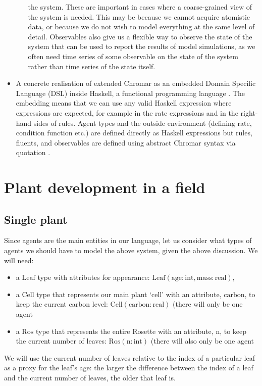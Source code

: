 \documentclass[phd]{infthesis}
\begin{document}
\begin{itemize}
\begin{itemize}
    the system. These are important in cases where a coarse-grained view of the
    system is needed. This may be because we cannot acquire atomistic data, or
    because we do not wish to model everything at the same level of
    detail. Observables also give us a flexible way to observe the state of the
    system that can be used to report the results of model simulations, as we
    often need time series of some observable on the state of the system rather
    than time series of the state itself.
\end{itemize}
\item A concrete realisation of extended Chromar as an embedded Domain Specific
  Language (DSL) inside Haskell, a functional programming language
  \citep{gibbons_functional_2015}. The embedding means that we can use any valid
  Haskell expression where expressions are expected, for example in the rate
  expressions and in the right-hand sides of rules. Agent types and the outside
  environment (defining rate, condition function etc.) are defined directly as
  Haskell expressions but rules, fluents, and observables are defined using
  abstract Chromar syntax via quotation \citep{mainland_why_2007}.
\end{itemize}

\section{Plant development in a field}

\subsection{Single plant}
Since agents are the main entities in our language, let us
consider what types of agents we should have to model the above
system, given the above discussion. We will need:
\begin{itemize}
\item a $\mathrm{Leaf}$ type with attributes for 
appearance: $\mathrm{Leaf}(\mathrm{age}:\mathrm{int},
\mathrm{mass}:\mathrm{real})$,
\item a $\mathrm{Cell}$ type that represents our main plant `cell' with an
attribute, $\mathrm{carbon}$, to keep the current carbon level:
$\mathrm{Cell}(\mathrm{carbon}:\mathrm{real})$ (there will only be one agent
\item a $\mathrm{Ros}$ type that represents the entire Rosette with an
attribute, $\mathrm{n}$, to keep the current number of leaves:
$\mathrm{Ros}(\mathrm{n}:\mathrm{int})$ (there will also only be one agent
\end{itemize}
We will use the current number of leaves relative to the index of
a particular leaf as a proxy for the leaf's age: the larger the difference
between the index of a leaf and the current number of leaves, the older that
leaf is.
\end{document}
